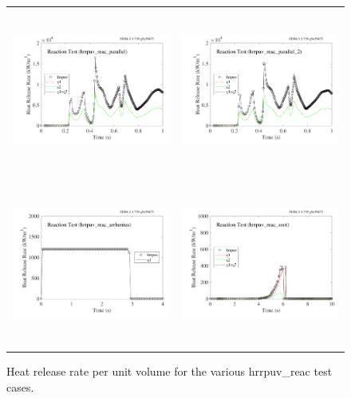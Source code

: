 \documentclass[11pt]{book}
\begin{document}
\begin{figure}[p]
\begin{tabular*}{\textwidth}{lr}
\includegraphics[height=2.15in]{SCRIPT_FIGURES/hrrpuv_reac_parallel} &
\includegraphics[height=2.15in]{SCRIPT_FIGURES/hrrpuv_reac_parallel_2} \\
\includegraphics[height=2.15in]{SCRIPT_FIGURES/hrrpuv_reac_arrhenius} &
\includegraphics[height=2.15in]{SCRIPT_FIGURES/hrrpuv_reac_soot}
\end{tabular*}
\caption[Results of the {\ct hrrpuv\_reac} test cases]{Heat release rate per unit volume for the various {\ct hrrpuv\_reac} test cases.}
\label{hrrpuv_reac_figures}
\end{figure}
\end{document}
